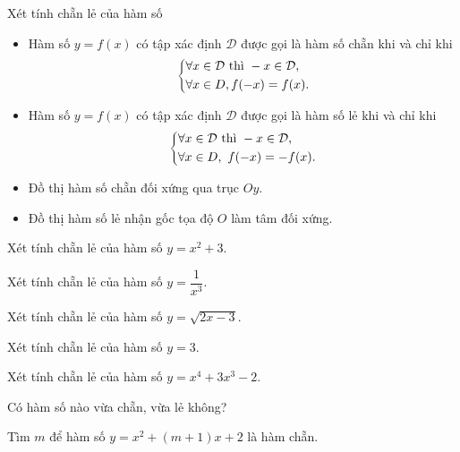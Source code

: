 \begin{dang}{Xét tính chẵn lẻ của hàm số}
	\begin{itemize}
		\item Hàm số $y=f(x)$ có tập xác định $\mathcal{D}$ được gọi là hàm số chẵn khi và chỉ khi $$ \left\{\begin{aligned} & \forall x \in \mathcal{D} \,\, \text{thì} \,\, -x \in \mathcal{D}, \\ & \forall x\in D,  f(-x)=f(x).\end{aligned}\right.$$
		\item Hàm số $y=f(x)$ có tập xác định $\mathcal{D}$ được gọi là hàm số lẻ khi và chỉ khi
		$$ \left\{\begin{aligned} & \forall x \in \mathcal{D} \,\, \text{thì} \,\, -x \in \mathcal{D},\\ & \forall x\in D, \ f(-x)=-f(x).\end{aligned}\right.$$
		\item  Đồ thị hàm số chẵn đối xứng qua trục $Oy$.
		\item Đồ thị hàm số lẻ nhận gốc tọa độ $O$ làm tâm đối xứng.
	\end{itemize}
\end{dang}

\begin{vd}%
	Xét tính chẵn lẻ của hàm số $y=x^2+3$.
\end{vd}
\begin{vd}%
	Xét tính chẵn lẻ của hàm số $y=\dfrac{1}{x^3}$.
\end{vd}
\begin{vd}%
	Xét tính chẵn lẻ của hàm số $y=\sqrt{2x-3}$.
	\loigiai{
		TXĐ $\mathcal{D}=\left[\dfrac{3}{2};+\infty \right)$, do đó $x=4 \in \mathcal{D}$ thì $-x=-4 \notin \mathcal{D}$. Vậy hàm đang xét không chẵn, không lẻ.}
\end{vd}
\begin{vd}%
	Xét tính chẵn lẻ của hàm số $y=3$.
\end{vd}
\begin{vd}%
	Xét tính chẵn lẻ của hàm số $y=x^4+3x^3-2$.
\end{vd}
\begin{vd}%
	Có hàm số nào vừa chẵn, vừa lẻ không?
\end{vd}
\begin{vd}%
	Tìm $m$ để hàm số $y=x^2+(m+1)x+2$ là hàm chẵn.
\end{vd}

